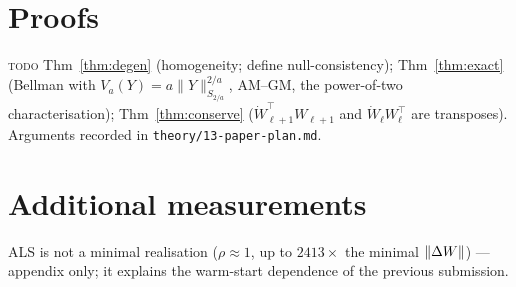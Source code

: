 \documentclass{article}
\newcommand{\TD}{{\color{orange!85!black}\textsc{todo}}}
\newcommand{\NOTE}[1]{{\color{gray}\small #1}}
\theoremstyle{plain}\newtheorem{theorem}{Theorem}\newtheorem{lemma}[theorem]{Lemma}
\theoremstyle{definition}\newtheorem{definition}[theorem]{Definition}
\begin{document}

\appendix
\section{Proofs}
\NOTE{\TD{} Thm~\ref{thm:degen} (homogeneity; define null-consistency); Thm~\ref{thm:exact}
(Bellman with $V_a(Y)=a\|Y\|_{S_{2/a}}^{2/a}$, AM--GM, the power-of-two characterisation);
Thm~\ref{thm:conserve} ($\dot W_{\ell+1}^\top W_{\ell+1}$ and $\dot W_\ell W_\ell^\top$ are
transposes). Arguments recorded in \texttt{theory/13-paper-plan.md}.}
\section{Additional measurements}
\NOTE{ALS is not a minimal realisation ($\rho\approx1$, up to $2413\times$ the minimal
$\|\Delta W\|$) --- appendix only; it explains the warm-start dependence of the previous submission.}
\end{document}
